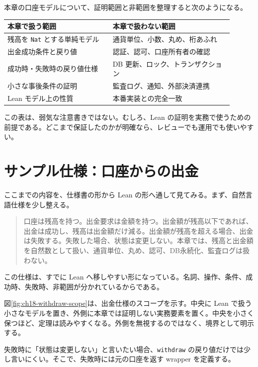 本章の口座モデルについて、証明範囲と非範囲を整理すると次のようになる。

\begin{center}
\begin{tabular}{p{0.42\linewidth}p{0.48\linewidth}}
\toprule
本章で扱う範囲 & 本章で扱わない範囲 \\
\midrule
残高を \texttt{Nat} とする単純モデル & 通貨単位、小数、丸め、桁あふれ \\
出金成功条件と戻り値 & 認証、認可、口座所有者の確認 \\
成功時・失敗時の戻り値仕様 & DB 更新、ロック、トランザクション \\
小さな事後条件の証明 & 監査ログ、通知、外部決済連携 \\
Lean モデル上の性質 & 本番実装との完全一致 \\
\bottomrule
\end{tabular}
\end{center}

この表は、弱気な注意書きではない。むしろ、Lean の証明を実務で使うための前提である。どこまで保証したのかが明確なら、レビューでも運用でも使いやすい。

\section{サンプル仕様：口座からの出金}

ここまでの内容を、仕様書の形から Lean の形へ通して見てみる。まず、自然言語仕様を少し整える。

\begin{quote}
口座は残高を持つ。出金要求は金額を持つ。出金額が残高以下であれば、出金は成功し、残高は出金額だけ減る。出金額が残高を超える場合、出金は失敗する。失敗した場合、状態は変更しない。本章では、残高と出金額を自然数として扱い、通貨単位、丸め、認可、DB永続化、監査ログは扱わない。
\end{quote}

この仕様は、すでに Lean へ移しやすい形になっている。名詞、操作、条件、成功時、失敗時、非範囲が分かれているからである。


図\ref{fig:ch18-withdraw-scope}は、出金仕様のスコープを示す。中央に Lean で扱う小さなモデルを置き、外側に本章では証明しない実務要素を置く。中央を小さく保つほど、定理は読みやすくなる。外側を無視するのではなく、境界として明示する。

失敗時に「状態は変更しない」と言いたい場合、\texttt{withdraw} の戻り値だけでは少し言いにくい。そこで、失敗時には元の口座を返す wrapper を定義する。

